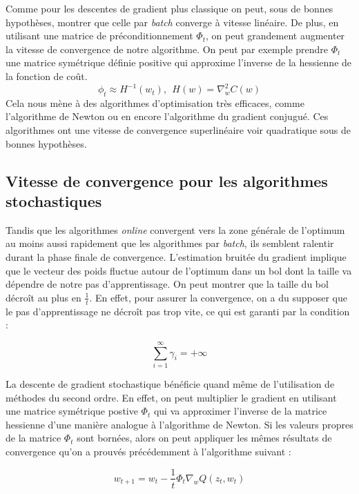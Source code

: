 \documentclass{article}
\begin{document}
Comme pour les descentes de gradient plus classique on peut, sous de bonnes hypothèses, montrer que celle par \emph{batch} converge à vitesse linéaire. De plus, en utilisant une matrice de préconditionnement $\Phi_t$, on peut grandement augmenter la vitesse de convergence de notre algorithme. On peut par exemple prendre $\Phi_t$ une matrice symétrique définie positive qui approxime l'inverse de la hessienne de la fonction de coût.
    \begin{equation*}
        \phi_t\approx H^{-1}(w_t),~~H(w)=\nabla_w^2C(w)
    \end{equation*}
Cela nous mène à des algorithmes d'optimisation très efficaces, comme l'algorithme de Newton ou en encore l'algorithme du gradient conjugué. Ces algorithmes ont une vitesse de convergence superlinéaire voir quadratique sous de bonnes hypothèses.

\subsection{Vitesse de convergence pour les algorithmes stochastiques}

Tandis que les algorithmes \emph{online} convergent vers la zone générale de l'optimum au moins aussi rapidement que les algorithmes par \emph{batch}, ils semblent ralentir durant la phase finale de convergence\cite{Bottou_stochasticgradient_tricks}. L'estimation bruitée du gradient implique que le vecteur des poids fluctue autour de l'optimum dans un bol dont la taille va dépendre de notre pas d'apprentissage. On peut montrer que la taille du bol décroît au plus en $\frac{1}{t}$. En effet, pour assurer la convergence, on a du supposer que le pas d'apprentissage ne décroît pas trop vite, ce qui est garanti par la condition :

\begin{equation*}
    \sum_{i=1}^\infty\gamma_i = +\infty
\end{equation*}

La descente de gradient stochastique bénéficie quand même de l'utilisation de méthodes du second ordre. En effet, on peut multiplier le gradient en utilisant une matrice symétrique postive $\Phi_t$ qui va approximer l'inverse de la matrice hessienne d'une manière analogue à l'algorithme de Newton. Si les valeurs propres de la matrice $\Phi_t$ sont bornées, alors on peut appliquer les mêmes résultats de convergence qu'on a prouvés précédemment à l'algorithme suivant :

\begin{equation}\label{update_sto_2nd_ordre}
    w_{t+1} = w_t -\frac{1}{t} \Phi_t \nabla_wQ(z_t,w_t)           
\end{equation}
\end{document}
